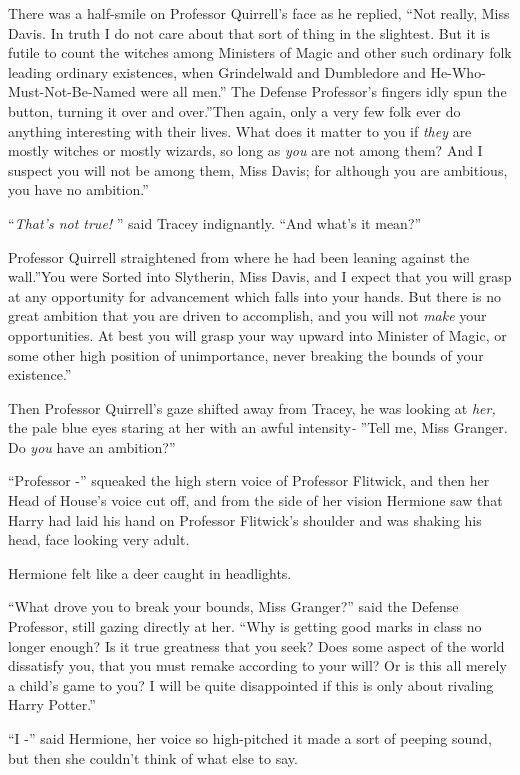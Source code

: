 There was a half-smile on Professor Quirrell's face as he replied, ``Not
really, Miss Davis. In truth I do not care about that sort of thing in
the slightest. But it is futile to count the witches among Ministers of
Magic and other such ordinary folk leading ordinary existences, when
Grindelwald and Dumbledore and He-Who-Must-Not-Be-Named were all men.''
The Defense Professor's fingers idly spun the button, turning it over
and over.''Then again, only a very few folk ever do anything interesting
with their lives. What does it matter to you if \emph{they} are mostly
witches or mostly wizards, so long as \emph{you} are not among them? And
I suspect you will not be among them, Miss Davis; for although you are
ambitious, you have no ambition.''

``\emph{That's not true!} '' said Tracey indignantly. ``And what's it
mean?''

Professor Quirrell straightened from where he had been leaning against
the wall.''You were Sorted into Slytherin, Miss Davis, and I expect that
you will grasp at any opportunity for advancement which falls into your
hands. But there is no great ambition that you are driven to accomplish,
and you will not \emph{make} your opportunities. At best you will grasp
your way upward into Minister of Magic, or some other high position of
unimportance, never breaking the bounds of your existence.''

Then Professor Quirrell's gaze shifted away from Tracey, he was looking
at \emph{her,} the pale blue eyes staring at her with an awful
intensity\emph{-} ''Tell me, Miss Granger. Do \emph{you} have an
ambition?''

``Professor -'' squeaked the high stern voice of Professor Flitwick, and
then her Head of House's voice cut off, and from the side of her vision
Hermione saw that Harry had laid his hand on Professor Flitwick's
shoulder and was shaking his head, face looking very adult.

Hermione felt like a deer caught in headlights.

``What drove you to break your bounds, Miss Granger?'' said the Defense
Professor, still gazing directly at her. ``Why is getting good marks in
class no longer enough? Is it true greatness that you seek? Does some
aspect of the world dissatisfy you, that you must remake according to
your will? Or is this all merely a child's game to you? I will be quite
disappointed if this is only about rivaling Harry Potter.''

``I -'' said Hermione, her voice so high-pitched it made a sort of
peeping sound, but then she couldn't think of what else to say.

